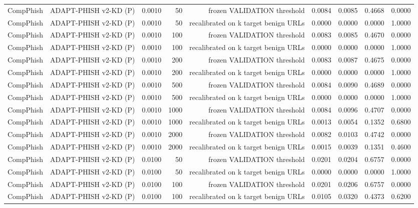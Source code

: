 \begin{table}[t]
\begin{tabular}{llrrrrrrr}
CompPhish & ADAPT-PHISH v2-KD (P) & 0.0010 & 50 & frozen VALIDATION threshold & 0.0084 & 0.0085 & 0.4668 & 0.0000 \\
CompPhish & ADAPT-PHISH v2-KD (P) & 0.0010 & 50 & recalibrated on k target benign URLs & 0.0000 & 0.0000 & 0.0000 & 1.0000 \\
CompPhish & ADAPT-PHISH v2-KD (P) & 0.0010 & 100 & frozen VALIDATION threshold & 0.0083 & 0.0085 & 0.4670 & 0.0000 \\
CompPhish & ADAPT-PHISH v2-KD (P) & 0.0010 & 100 & recalibrated on k target benign URLs & 0.0000 & 0.0000 & 0.0000 & 1.0000 \\
CompPhish & ADAPT-PHISH v2-KD (P) & 0.0010 & 200 & frozen VALIDATION threshold & 0.0083 & 0.0087 & 0.4675 & 0.0000 \\
CompPhish & ADAPT-PHISH v2-KD (P) & 0.0010 & 200 & recalibrated on k target benign URLs & 0.0000 & 0.0000 & 0.0000 & 1.0000 \\
CompPhish & ADAPT-PHISH v2-KD (P) & 0.0010 & 500 & frozen VALIDATION threshold & 0.0084 & 0.0090 & 0.4689 & 0.0000 \\
CompPhish & ADAPT-PHISH v2-KD (P) & 0.0010 & 500 & recalibrated on k target benign URLs & 0.0000 & 0.0000 & 0.0000 & 1.0000 \\
CompPhish & ADAPT-PHISH v2-KD (P) & 0.0010 & 1000 & frozen VALIDATION threshold & 0.0084 & 0.0096 & 0.4707 & 0.0000 \\
CompPhish & ADAPT-PHISH v2-KD (P) & 0.0010 & 1000 & recalibrated on k target benign URLs & 0.0013 & 0.0054 & 0.1352 & 0.6800 \\
CompPhish & ADAPT-PHISH v2-KD (P) & 0.0010 & 2000 & frozen VALIDATION threshold & 0.0082 & 0.0103 & 0.4742 & 0.0000 \\
CompPhish & ADAPT-PHISH v2-KD (P) & 0.0010 & 2000 & recalibrated on k target benign URLs & 0.0015 & 0.0039 & 0.1351 & 0.4600 \\
CompPhish & ADAPT-PHISH v2-KD (P) & 0.0100 & 50 & frozen VALIDATION threshold & 0.0201 & 0.0204 & 0.6757 & 0.0000 \\
CompPhish & ADAPT-PHISH v2-KD (P) & 0.0100 & 50 & recalibrated on k target benign URLs & 0.0000 & 0.0000 & 0.0000 & 1.0000 \\
CompPhish & ADAPT-PHISH v2-KD (P) & 0.0100 & 100 & frozen VALIDATION threshold & 0.0201 & 0.0206 & 0.6757 & 0.0000 \\
CompPhish & ADAPT-PHISH v2-KD (P) & 0.0100 & 100 & recalibrated on k target benign URLs & 0.0105 & 0.0320 & 0.4373 & 0.6200 \\

\end{tabular}
\end{table}
